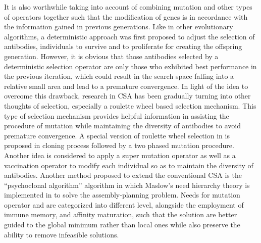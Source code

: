 \documentclass[12pt]{article}
\begin{document}
It is also worthwhile taking into account of combining mutation and other types of operators together such that the modification of genes is in accordance with the information gained in previous generations. Like in other evolutionary algorithms, a deterministic approach was first proposed to adjust the selection of antibodies, individuals to survive and to proliferate for creating the offspring generation. However, it is obvious that those antibodies selected by a deterministic selection operator are only those who exhibited best performance in the previous iteration, which could result in the search space falling into a relative small area and lead to a premature convergence. In light of the idea to overcome this drawback, research in CSA has been gradually turning into other thoughts of selection, especially a roulette wheel based selection mechanism. This type of selection mechanism provides helpful information in assisting the procedure of mutation while maintaining the diversity of antibodies to avoid premature convergence. A special version of roulette wheel selection in \cite{Engin04Anewapproach} is proposed in cloning process followed by a two phased mutation procedure. Another idea is considered to apply a super mutation operator as well as a vaccination operator to modify each individual so as to maintain the diversity of antibodies. \cite{Ma09Animproved} Another method proposed to extend the  conventional CSA is the ``psychoclonal algorithm''  algorithm \cite{Tiwari05Determinationof} in which Maslow's need hierarchy theory is implemented in to solve the assembly-planning problem. Needs for mutation operator and are categorized into different level, alongside the employment of immune memory, and affinity maturation, such that the solution are better guided to the global minimum rather than local ones while also preserve the ability to remove infeasible solutions.



\end{document}
